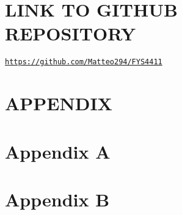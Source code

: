 \documentclass[a4paper, twocolumn]{article}
\begin{document}
\section*{LINK TO GITHUB REPOSITORY}
\centerline{\href{https://github.com/Matteo294/FYS4411}{\texttt{https://github.com/Matteo294/FYS4411}}}


% 

\clearpage
\section*{APPENDIX}
\appendix
\section*{Appendix A}

\section*{Appendix B}


\newpage
\twocolumn[{
\begin{multicols}{2}
\printbibliography
\end{multicols}
}]
\end{document}

